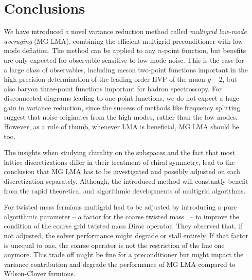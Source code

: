 \chapter{Conclusions}
\label{ch:p2:conclusions}



We have introduced a novel variance reduction method called \emph{multigrid low-mode averaging} (MG LMA), combining the efficient multigrid preconditioner with low-mode deflation.
The method can be applied to any $n$-point function, but benefits are only expected for observable sensitive to low-mode noise.
This is the case for a large class of observables, including meson two-point functions important in the high-precision determination of the leading-order HVP of the muon $g-2$, but also baryon three-point functions important for hadron spectroscopy.
For disconnected diagrams leading to one-point functions, we do not expect a huge gain in variance reduction, since the success of methods like frequency splitting suggest that noise originates from the high modes, rather than the low modes.
However, as a rule of thumb, whenever LMA is beneficial, MG LMA should be too.

The insights when studying chirality on the subspaces and the fact that most lattice discretizations differ in their treatment of chiral symmetry, lead to the conclusion that MG LMA has to be investigated and possibly adjusted on each discretization separately.
Although, the introduced method will constantly benefit from the rapid theoretical and algorithmic developments of multigrid algorithms.

For twisted mass fermions multigrid had to be adjusted by introducing a pure algorithmic parameter -- a factor for the coarse twisted mass~\cite{Alexandrou:2016izb} -- to improve the condition of the coarse grid twisted mass Dirac operator.
They observed that, if not adjusted, the solver performance might degrade or stall entirely.
If that factor is unequal to one, the coarse operator is not the restriction of the fine one anymore.
This trade off might be fine for a preconditioner but might impact the variance contribution and degrade the performance of MG LMA compared to Wilson-Clover fermions.

